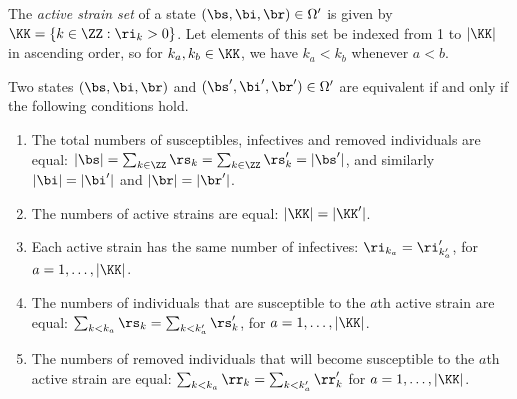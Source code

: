 \documentclass[review]{elsarticle}
\begin{document}
\begin{mydef}
	The \emph{active strain set} of a state $(\bs, \bi, \br) \in \Omega'$ is given by $\KK = \{k \in \ZZ : \ri_k > 0\}$. Let elements of this set be indexed from 1 to $|\KK|$ in ascending order, so for $k_a, k_b \in \KK$, we have $k_a < k_b$ whenever $a < b$.
\end{mydef}
\begin{mydef}\label{def: equiv}
	Two states $(\bs,\bi,\br)$ and $(\bs', \bi', \br') \in \Omega'$ are equivalent if and only if the following conditions hold.
	\begin{enumerate}
		\item The total numbers of susceptibles, infectives and removed individuals are equal: $|\bs| = \sum_{k\in \ZZ} \rs_k = \sum_{k\in\ZZ} \rs'_k = |\bs'|$, and similarly $|\bi| = |\bi'|$ and $|\br| = |\br'|$.
		\item The numbers of active strains are equal: $|\KK| = |\KK'|$.

		\item Each active strain has the same number of infectives: $\ri_{k_a} = \ri'_{k'_a}$, for $a = 1, \dots, |\KK|$.
		\item The numbers of individuals that are susceptible to the $a$th active strain are equal: $\sum_{k < k_a} \rs_k = \sum_{k < k'_a} \rs'_k$, for $a = 1, \dots, |\KK|$. 
		\item The numbers of removed individuals that will become susceptible to the $a$th active strain are equal: $\sum_{k < k_a} \rr_k = \sum_{k < k'_a} \rr'_k$ for $a = 1, \dots, |\KK|$.
	\end{enumerate}
\end{mydef}
\end{document}
